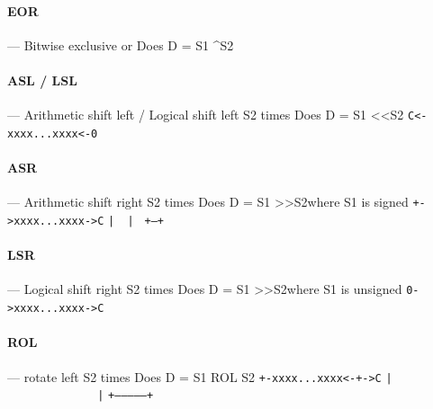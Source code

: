 \documentclass[11pt]{article}
\begin{document}
\paragraph{EOR} --- Bitwise exclusive or\newline
Does \newline D = S1 \textasciicircum S2

\paragraph{ASL / LSL} --- Arithmetic shift left / Logical shift left S2 times\newline
Does \newline D = S1 \textless \textless  S2
\newline
\texttt{C<-xxxx...xxxx<-0}

\paragraph{ASR} --- Arithmetic shift right S2 times\newline
Does \newline D = S1 \textgreater \textgreater  S2\newline  where S1 is signed
\newline
\texttt{+->xxxx...xxxx->C}\newline
\texttt{|~~|             }\newline
\texttt{+--+             }

\paragraph{LSR} --- Logical shift right S2 times\newline
Does \newline D = S1 \textgreater \textgreater  S2\newline  where S1 is unsigned
\newline
\texttt{0->xxxx...xxxx->C}

\paragraph{ROL} --- rotate left S2 times\newline
Does \newline D = S1 ROL S2\newline
\texttt{+-xxxx...xxxx<-+->C}\newline
\texttt{|~~~~~~~~~~~~~~|}\newline
\texttt{+--------------+}
\end{document}
